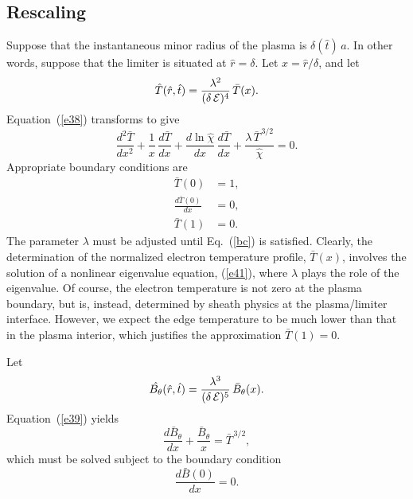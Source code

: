 \documentclass[12pt,prb,aps]{revtex4-1}
\begin{document}
\subsection{Rescaling}
Suppose that the instantaneous minor radius of the plasma is $\delta(\hat{t})\,a$. In other words, suppose that the limiter
is situated at $\hat{r}= \delta$. Let $x=\hat{r}/\delta$, and let
\begin{equation}
\hat{T}(\hat{r},\hat{t}) = \frac{\lambda^2}{(\delta\,{\cal E})^4}\,\bar{T}(x).
\end{equation}
Equation~(\ref{e38}) transforms to give
\begin{equation}\label{e41}
\frac{d^2\bar{T}}{dx^2} + \frac{1}{x}\,\frac{d\bar{T}}{dx} + \frac{d\ln\hat{\chi}}{dx}\,\frac{d\bar{T}}{dx} + \frac{\lambda\,\bar{T}^{\,3/2}}{\hat{\chi}}=0.
\end{equation}
Appropriate boundary conditions are 
\begin{align}
\bar{T}(0) &=1,\\[0.5ex]
\frac{d\bar{T}(0)}{dx}& = 0,\\[0.5ex]
\bar{T}(1) &= 0.\label{bc}
\end{align}
The parameter $\lambda$ must be adjusted until Eq.~(\ref{bc}) is satisfied. Clearly, the determination of the normalized electron temperature profile, $\bar{T}(x)$, 
involves the solution of a nonlinear eigenvalue equation, (\ref{e41}), where $\lambda$ plays the role of the eigenvalue. Of course, the electron temperature is not zero at the
plasma boundary, but is, instead, determined by sheath physics at the plasma/limiter interface. However, we expect the edge temperature to
be much lower than that in the plasma interior, which justifies the approximation $\bar{T}(1)=0$. 

Let 
\begin{equation}
\hat{B_\theta}(\hat{r},\hat{t}) = \frac{\lambda^3}{(\delta\,{\cal E})^5}\,\bar{B}_\theta(x).
\end{equation}
Equation~(\ref{e39}) yields 
\begin{equation}
\frac{d\bar{B}_\theta}{dx} + \frac{\bar{B}_\theta}{x} = \bar{T}^{\,3/2},
\end{equation}
which must be solved subject to the boundary condition
\begin{equation}
\frac{d\bar{B}(0)}{dx}=0.
\end{equation}
\end{document}
